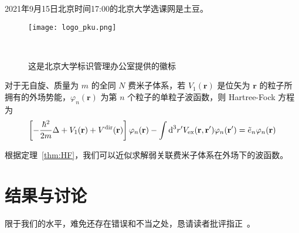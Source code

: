 \documentclass[cn,hazy,pku,12pt,normal,math=newtx,cite=super]{elegantnote}
\begin{document}
\begin{example}
	2021年9月15日北京时间17:00的北京大学选课网是土豆。
\end{example}


\begin{figure}[htbp]
	\centering
	\texttt{[image: logo\_pku.png]}
	
	\
	
	\caption{这是北京大学标识管理办公室提供的徽标}
	\label{fig:1}%
\end{figure}


\begin{theorem}\label{thm:HF}
对于无自旋、质量为 $m$ 的全同 $N$ 费米子体系，若 $V_1(\mathbf r)$ 是位矢为 $\mathbf r$ 的粒子所拥有的外场势能，$\varphi_n(\mathbf r)$ 为第 $n$ 个粒子的单粒子波函数，则 Hartree-Fock 方程为
\begin{equation}\label{eq:HF}
  \left[-\frac{\hbar^2}{2m}\Delta+V_1(\mathbf r)+V^{\text{dir}}(\mathbf r)\right]\varphi_n(\mathbf r)-\int\text d^3r'V_\text{ex}(\mathbf r,\mathbf r')\varphi_n(\mathbf r')=\tilde e_n\varphi_n(\mathbf r)
\end{equation}
\end{theorem}


根据定理~\ref{thm:HF}，我们可以近似求解弱关联费米子体系在外场下的波函数。


\section{结果与讨论}

限于我们的水平，难免还存在错误和不当之处，恳请读者批评指正~\cite{pcl2002}。


\nocite{*}

\end{document}
